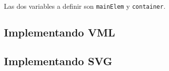 Las dos variables a definir son \texttt{mainElem} y \texttt{container}.

\subsection{Implementando VML}



\subsection{Implementando SVG}

